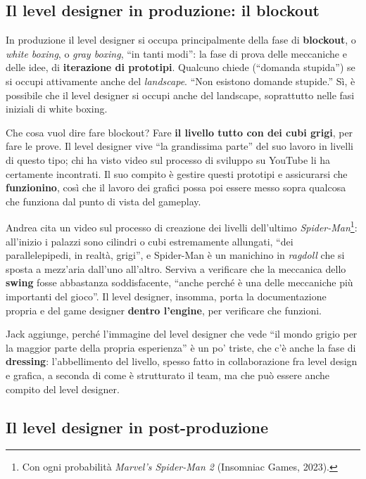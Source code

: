 \subsection{Il level designer in produzione: il blockout}

In produzione il level designer si occupa principalmente della fase di
\textbf{blockout}, o \emph{white boxing}, o \emph{gray boxing}, ``in tanti
modi'': la fase di prova delle meccaniche e delle idee, di
\textbf{iterazione di prototipi}. Qualcuno chiede (``domanda stupida'') se si
occupi attivamente anche del \emph{landscape}. ``Non esistono domande
stupide.'' Sì, è possibile che il level designer si occupi anche del
landscape, soprattutto nelle fasi iniziali di white boxing.

Che cosa vuol dire fare blockout? Fare \textbf{il livello tutto con dei cubi
grigi}, per fare le prove. Il level designer vive ``la grandissima parte''
del suo lavoro in livelli di questo tipo; chi ha visto video sul processo di
sviluppo su YouTube li ha certamente incontrati. Il suo compito è gestire
questi prototipi e assicurarsi che \textbf{funzionino}, così che il lavoro
dei grafici possa poi essere messo sopra qualcosa che funziona dal punto di
vista del gameplay.

Andrea cita un video sul processo di creazione dei livelli dell'ultimo
\emph{Spider-Man}\footnote{Con ogni probabilità \emph{Marvel's Spider-Man 2}
(Insomniac Games, 2023).}: all'inizio i palazzi sono cilindri o cubi
estremamente allungati, ``dei parallelepipedi, in realtà, grigi'', e
Spider-Man è un manichino in \emph{ragdoll} che si sposta a mezz'aria
dall'uno all'altro. Serviva a verificare che la meccanica dello
\textbf{swing} fosse abbastanza soddisfacente, ``anche perché è una delle
meccaniche più importanti del gioco''. Il level designer, insomma, porta la
documentazione propria e del game designer \textbf{dentro l'engine}, per
verificare che funzioni.

Jack aggiunge, perché l'immagine del level designer che vede ``il mondo
grigio per la maggior parte della propria esperienza'' è un po' triste, che
c'è anche la fase di \textbf{dressing}: l'abbellimento del livello, spesso
fatto in collaborazione fra level design e grafica, a seconda di come è
strutturato il team, ma che può essere anche compito del level designer.

\subsection{Il level designer in post-produzione}

